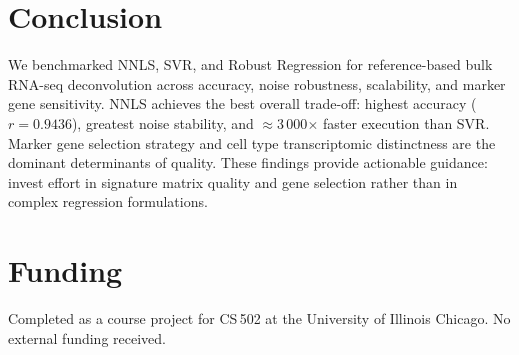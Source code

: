\documentclass[10pt,twocolumn]{article}
\begin{document}
\section{Conclusion}

We benchmarked NNLS, SVR, and Robust Regression for reference-based bulk
RNA-seq deconvolution across accuracy, noise robustness, scalability, and
marker gene sensitivity. NNLS achieves the best overall trade-off: highest
accuracy ($r=0.9436$), greatest noise stability, and $\approx$3\,000$\times$
faster execution than SVR. Marker gene selection strategy and cell type
transcriptomic distinctness are the dominant determinants of quality.
These findings provide actionable guidance: invest effort in signature matrix
quality and gene selection rather than in complex regression formulations.

\section*{Funding}

Completed as a course project for CS\,502 at the University of Illinois
Chicago. No external funding received.
\end{document}
